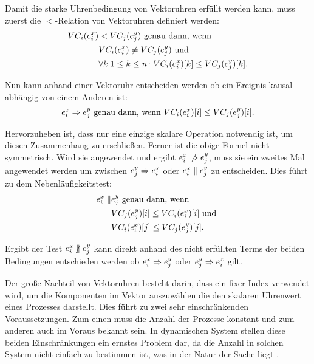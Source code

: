 Damit die starke Uhrenbedingung von Vektoruhren erfüllt werden kann, muss zuerst die $<$-Relation von Vektoruhren definiert werden:
\begin{align*}
VC_i(e_i^x) &< VC_j(e_j^y) \text{ genau dann, wenn} \\
       & VC_i(e_i^x) \ne VC_j(e_j^y) \text{ und } \\
       & \forall k | 1 \leq k \leq n \colon VC_i(e_i^x)[k] \leq VC_j(e_j^y)[k].
\end{align*}

Nun kann anhand einer Vektoruhr entscheiden werden ob ein Ereignis kausal abhängig von einem Anderen ist:
\begin{equation*}
    e_i^x \Rightarrow e_j^y \text{ genau dann, wenn } VC_i(e_i^x)[i] \leq VC_j(e_j^y)[i].
\end{equation*}

Hervorzuheben ist, dass nur eine einzige skalare Operation notwendig ist, um diesen Zusammenhang zu erschließen.
Ferner ist die obige Formel nicht symmetrisch.
Wird sie angewendet und ergibt $\eix \centernot\Rightarrow \ejy$, muss sie ein zweites Mal angewendet werden um zwischen $e_j^y \Rightarrow e_i^x$ oder $e_i^x \parallel e_j^y$ zu entscheiden.
Dies führt zu dem Nebenläufigkeitstest:
\begin{align*}
    e_i^x \parallel & e_j^y \text{ genau dann, wenn } \\
                   & VC_j(e_j^y)[i] \le VC_i(e_i^x)[i] \text{ und } \\
                   & VC_i(e_i^x)[j] \le VC_j(e_j^y)[j].
\end{align*}

Ergibt der Test $\eix \centernot\parallel \ejy$ kann direkt anhand des nicht erfüllten Terms der beiden Bedingungen entschieden werden ob $e_i^x \Rightarrow e_j^y$ oder $e_j^y \Rightarrow e_i^x$ gilt.

Der große Nachteil von Vektoruhren besteht darin, dass ein fixer Index verwendet wird, um die Komponenten im Vektor auszuwählen die den skalaren Uhrenwert eines Prozesses darstellt.
Dies führt zu zwei sehr einschränkenden Voraussetzungen.
Zum einen muss die Anzahl der Prozesse konstant und zum anderen auch im Voraus bekannt sein.
In dynamischen System stellen diese beiden Einschränkungen ein ernstes Problem dar, da die Anzahl in solchen System nicht einfach zu bestimmen ist, was in der Natur der Sache liegt \cite{landes2006dynamic}.

